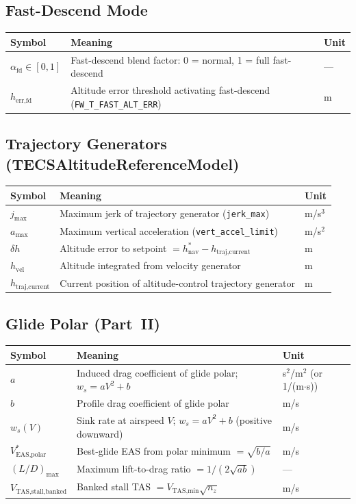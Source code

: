 \documentclass[12pt,a4paper]{article}
\begin{document}
\subsection*{Fast-Descend Mode}
\begin{center}\begin{tabular}{lll}\toprule
Symbol & Meaning & Unit \\\midrule
$\alpha_{\text{fd}} \in [0,1]$ & Fast-descend blend factor: 0 = normal, 1 = full fast-descend & --- \\
$h_{\text{err,fd}}$ & Altitude error threshold activating fast-descend (\texttt{FW\_T\_FAST\_ALT\_ERR}) & m \\
\bottomrule\end{tabular}\end{center}

\subsection*{Trajectory Generators (TECSAltitudeReferenceModel)}
\begin{center}\begin{tabular}{lll}\toprule
Symbol & Meaning & Unit \\\midrule
$j_{\max}$ & Maximum jerk of trajectory generator (\texttt{jerk\_max}) & m/s$^3$ \\
$a_{\max}$ & Maximum vertical acceleration (\texttt{vert\_accel\_limit}) & m/s$^2$ \\
$\delta h$ & Altitude error to setpoint $= h^*_{\text{nav}} - h_{\text{traj,current}}$ & m \\
$h_{\text{vel}}$ & Altitude integrated from velocity generator & m \\
$h_{\text{traj,current}}$ & Current position of altitude-control trajectory generator & m \\
\bottomrule\end{tabular}\end{center}

\subsection*{Glide Polar (Part~II)}
\begin{center}\begin{tabular}{lll}\toprule
Symbol & Meaning & Unit \\\midrule
$a$ & Induced drag coefficient of glide polar; $w_s = aV^2 + b$ & s$^2$/m$^2$ (or 1/(m$\cdot$s)) \\
$b$ & Profile drag coefficient of glide polar & m/s \\
$w_s(V)$ & Sink rate at airspeed $V$; $w_s = aV^2 + b$ (positive downward) & m/s \\
$V^*_{\text{EAS,polar}}$ & Best-glide EAS from polar minimum $= \sqrt{b/a}$ & m/s \\
$(L/D)_{\max}$ & Maximum lift-to-drag ratio $= 1/(2\sqrt{ab})$ & --- \\
$V_{\text{TAS,stall,banked}}$ & Banked stall TAS $= V_{\text{TAS,min}}\sqrt{n_z}$ & m/s \\
\bottomrule\end{tabular}\end{center}
\end{document}
